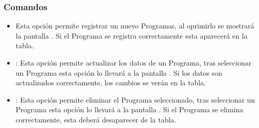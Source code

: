 \subsubsection{Comandos}
\begin{itemize}
 \item {} Esta opción permite registrar un nuevo Programas, al oprimirlo se mostrará la pantalla . Si el Programa se registra correctamente esta aparecerá en la tabla.
 
 \item {}: Esta opción permite actualizar los datos de un Programa, tras seleccionar un Programa esta opción lo llevará a la pantalla . Si los datos son actualizados correctamente, los cambios se verán en la tabla.

 \item {}: Esta opción permite eliminar el Programa seleccionado, tras seleccionar un Programa esta opción lo llevará a la pantalla . Si el Programa se elimina correctamente, esta deberá desaparecer de la tabla.
\end{itemize}

